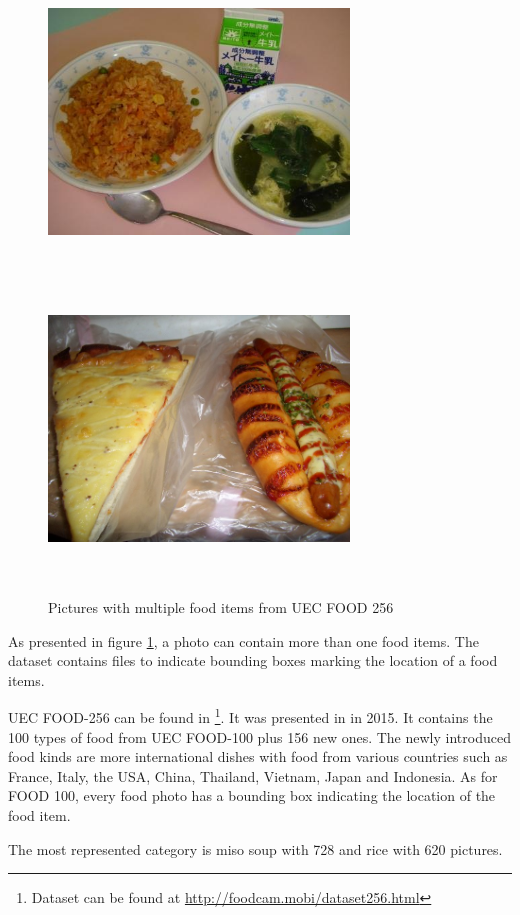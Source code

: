 \begin{figure}[h]
    \includegraphics[width=8cm, height=8cm]{img/multiple_food_items_3}
    \includegraphics[width=8cm, height=8cm]{img/multiple_food_items_4}
    \caption{Pictures with multiple food items from UEC FOOD 256}
    \label{fig:presentation_multiple_food_items}
\end{figure}

As presented in figure \ref{fig:presentation_multiple_food_items}, a photo can contain more than one food items. The dataset contains files to indicate bounding boxes marking the location of a food items.

UEC FOOD-256 can be found in \footnote{Dataset can be found at \url{http://foodcam.mobi/dataset256.html}}. It was presented in \cite{Kawano2015} in 2015. It contains  the 100 types of food from UEC FOOD-100 plus 156 new ones. The newly introduced food kinds are more international dishes with food from various countries such as France, Italy, the USA, China, Thailand, Vietnam, Japan and Indonesia. As for FOOD 100, every food photo has a bounding box indicating the location of the food item.

The most represented category is miso soup with 728 and rice with 620 pictures.